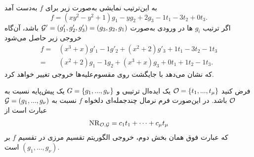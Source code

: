 \begin{example}
\begin{enumerate}
به این‌ترتیب نمایشی به‌صورت زیر برای 
$f$
به‌دست  آمد
$$f = (xy^{2} - y^{2} + 1)g_{1} - yg_{2} + 2g_{3} -1t_{1} -3t_{2} + 0t_{3}.$$
اگر ترتیب 
$g_{i}$
ها در ورودی به‌صورت
${\mathcal G}' = (g'_{1},g'_{2},g'_{3}) = (g_{3}, g_{2}, g_{1})$
باشد، آن‌گاه خروجی زیر حاصل می‌شود
\begin{align*}
f =& (x^{3} + x)g'_{1} - 1g'_{2} + (x^{2} + 2)g'_{3} + 1t_{1} - 3t_{2} - 1t_{3}\\
 =& (x^{2} + 2)g_{1}  -1g_{2}+ (x^{3} + x)g_{3} + 0t_{1} + 1t_{2} -1t_{3}.
\end{align*}
که نشان می‌دهد با جایگشت روی مقسوم‌علیه‌ها خروجی تغییر خواهد کرد. 
\end{enumerate}
\end{example}
\begin{definition}
	فرض کنید 
	${\mathcal O} = \{t_{1},...,t_{\mu}\}$
	یک ایده‌ال ترتیبی و 
	$G = \{g_{1},...,g_{\nu}\}$
	یک پیش‌پایه نسبت به 
	${\mathcal O}$
	باشد. در این‌صورت فرم نرمال چندجمله‌ای دلخواه 
	$f$
	نسبت به 
	${\mathcal G} = (g_{1},...,g_{\nu})$
	عبارت است از
	$$\operatorname{\mathrm{NR}}_{{\mathcal O}, {\mathcal G}} = c_{1}t_{1} + \cdots + c_{\mu}t_{\mu}$$
	که عبارت فوق همان بخش دوم، خروجی الگوریتم تقسیم مرزی در تقسیم 
	$f$
	بر 
	$(g_{1},...,g_{\nu})$
	است.
\end{definition}

